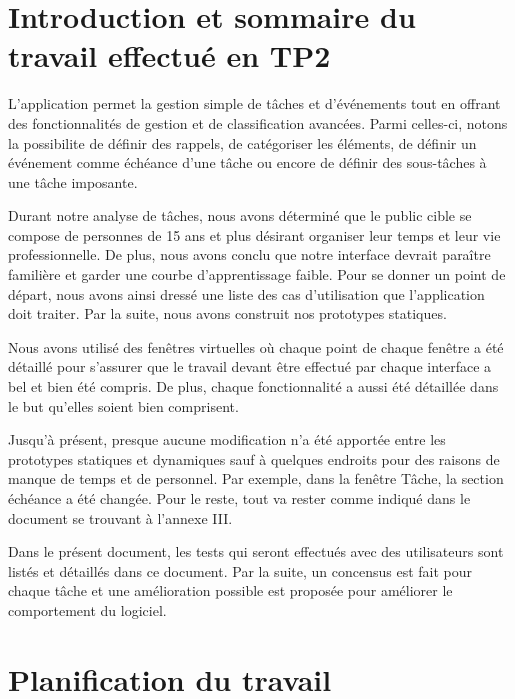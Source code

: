 \documentclass[letterpaper, oneside, 12pt, these, creativecommons]{thETS}
\begin{document}
\mainmatter

\chapter{Introduction et sommaire du travail effectué en TP2}

L'application permet la gestion simple de tâches et d'événements tout en offrant des fonctionnalités de gestion et de classification avancées. Parmi celles-ci, notons la possibilite de définir des rappels, de catégoriser les éléments, de définir un événement comme échéance d'une tâche ou encore de définir des sous-tâches à une tâche imposante.

Durant notre analyse de tâches, nous avons déterminé que le public cible se compose de personnes de 15 ans et plus désirant organiser leur temps et leur vie professionnelle. De plus, nous avons conclu que notre interface devrait paraître familière et garder une courbe d'apprentissage faible. Pour se donner un point de départ, nous avons ainsi dressé une liste des cas d'utilisation que l'application doit traiter. Par la suite, nous avons construit nos prototypes statiques.

Nous avons utilisé des fenêtres virtuelles où chaque point de chaque fenêtre a été détaillé pour s'assurer que le travail devant être effectué par chaque interface a bel et bien été compris. De plus, chaque fonctionnalité a aussi été détaillée dans le but qu'elles soient bien comprisent.

Jusqu'à présent, presque aucune modification n'a été apportée entre les prototypes statiques et dynamiques sauf à quelques endroits pour des raisons de manque de temps et de personnel. Par exemple, dans la fenêtre Tâche, la section échéance a été changée. Pour le reste, tout va rester comme indiqué dans le document se trouvant à l'annexe III.

Dans le présent document, les tests qui seront effectués avec des utilisateurs sont listés et détaillés dans ce document. Par la suite, un concensus est fait pour chaque tâche et une amélioration possible est proposée pour améliorer le comportement du logiciel.

\chapter{Planification du travail}
\end{document}
